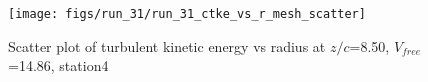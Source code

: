 \begin{figure}[H]
\centering
\texttt{[image: figs/run\_31/run\_31\_ctke\_vs\_r\_mesh\_scatter]}
\caption{Scatter plot of turbulent kinetic energy vs radius at $z/c$=8.50, $V_{free}$=14.86, station4}
\label{fig:run_31_ctke_vs_r_mesh_scatter}
\end{figure}


